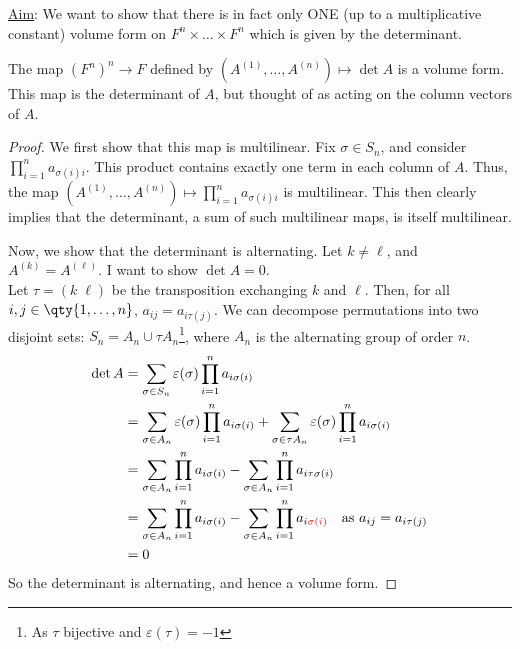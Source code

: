 \underline{Aim}: We want to show that there is in fact only ONE (up to a multiplicative constant) volume form on $F^n \times \dots \times F^n$ which is given by the determinant.

\begin{lemma}
	The map $(F^n)^n \to F$ defined by $(A^{(1)}, \dots, A^{(n)}) \mapsto \det A$ is a volume form.
	This map is the determinant of $A$, but thought of as acting on the column vectors of $A$.
\end{lemma}
\begin{proof}
	We first show that this map is multilinear.
	Fix $\sigma \in S_n$, and consider $\prod_{i=1}^n a_{\sigma(i) i}$.
	This product contains exactly one term in each column of $A$.
	Thus, the map $(A^{(1)}, \dots, A^{(n)}) \mapsto \prod_{i=1}^n a_{\sigma(i) i}$ is multilinear.
	This then clearly implies that the determinant, a sum of such multilinear maps, is itself multilinear.

	Now, we show that the determinant is alternating.
	Let $k \neq \ell$, and $A^{(k)} = A^{(\ell)}$.
	I want to show $\det A = 0$. \\
	Let $\tau = ( k \; \ell )$ be the transposition exchanging $k$ and $\ell$.
	Then, for all $i, j \in \qty{1, \dots, n}$, $a_{ij} = a_{i \tau(j)}$.
	We can decompose permutations into two disjoint sets: $S_n = A_n \cup \tau A_n$\footnote{As $\tau$ bijective and $\varepsilon(\tau) = -1$}, where $A_n$ is the alternating group of order $n$.
	\begin{align*}
		\det A &= \sum_{\sigma \in S_n} \varepsilon(\sigma) \prod_{i = 1}^n a_{i \sigma(i)} \\
		&= \sum_{\sigma\in A_n} \varepsilon(\sigma) \prod_{i = 1}^n a_{i \sigma(i)} + \sum_{\sigma \in \tau A_n} \varepsilon(\sigma) \prod_{i = 1}^n a_{i \sigma(i)} \\
		&= \sum_{\sigma\in A_n} \prod_{i = 1}^n a_{i \sigma(i)} - \sum_{\sigma\in A_n} \prod_{i = 1}^n a_{i \tau\sigma(i)} \\
		&= \sum_{\sigma\in A_n} \prod_{i = 1}^n a_{i \sigma(i)} - \sum_{\sigma\in A_n} \prod_{i = 1}^n a_{i \mathcolor{red}{\sigma(i)}} \quad \text{as $a_{ij} = a_{i \tau(j)}$} \\
		&= 0
	\end{align*} 
	So the determinant is alternating, and hence a volume form.
\end{proof}

